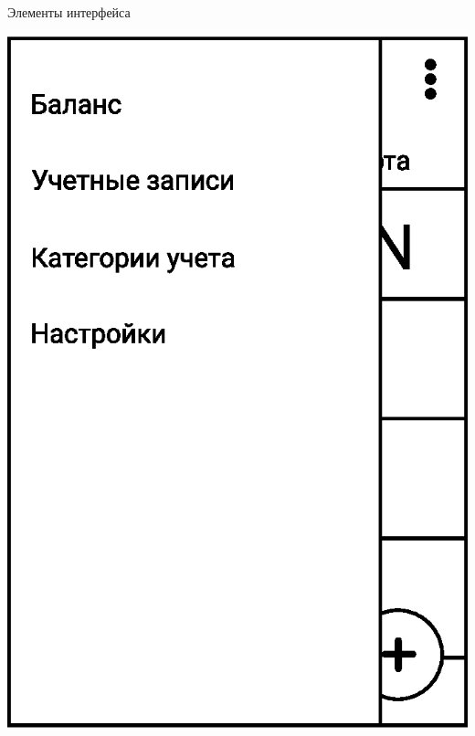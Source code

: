 \documentclass[russian,utf8,a1paper,nostitching,simple]{eskdgraph}
\begin{document}
\begin{ESKDdrawing}
  \vspace{2cm}
  \centering
  {\fontsize{50}{60}\selectfont Элементы интерфейса}

  \vspace{1.7cm}
  \begin{minipage}{17cm}
    \begin{minipage}{7.5cm}
      \vspace{0.6cm}
      \centering

      \vspace{2cm}
      \centering
      \includegraphics[width=\linewidth]{fig/ui_interface_main_menu.eps}
    \end{minipage}
    \hfill
    \begin{minipage}{7.5cm}
      \centering


\end{minipage}
\end{minipage}
\end{ESKDdrawing}
\end{document}
